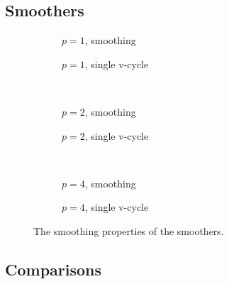 \subsection{Smoothers}


\begin{figure}
	\centering
	
	\begin{subfigure}[b]{0.45\textwidth}
		
		\caption{$p=1$, smoothing}
	\end{subfigure}
	\begin{subfigure}[b]{0.45\textwidth}
		
		\caption{$p=1$, single v-cycle}
	\end{subfigure}
	\\
	\begin{subfigure}[b]{0.45\textwidth}
		
		\caption{$p=2$, smoothing}
	\end{subfigure}
	\begin{subfigure}[b]{0.45\textwidth}
		
		\caption{$p=2$, single v-cycle}
	\end{subfigure}
	\\
	\begin{subfigure}[b]{0.45\textwidth}
		
		\caption{$p=4$, smoothing}
	\end{subfigure}
	\begin{subfigure}[b]{0.45\textwidth}
		
		\caption{$p=4$, single v-cycle}
	\end{subfigure}
	\caption{\label{fig:smoothers2} The smoothing properties of the smoothers.}
\end{figure}

\subsection{Comparisons}

